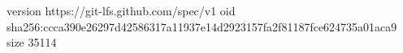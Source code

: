 version https://git-lfs.github.com/spec/v1
oid sha256:ccca390e26297d42586317a11937e14d2923157fa2f81187fce624735a01aca9
size 35114
